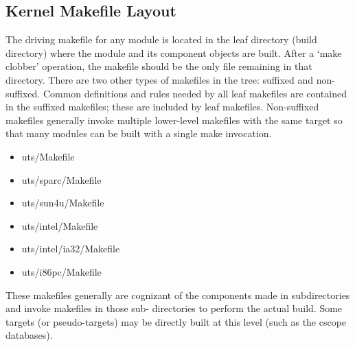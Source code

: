 \documentclass{article}
\begin{document}
\subsection*{Kernel Makefile Layout}

The driving makefile for any module is located in the leaf directory (build
directory) where the module and its component objects are built. After a `make
clobber' operation, the makefile should be the only file remaining in that
directory. There are two other types of makefiles in the tree: suffixed and
non-suffixed. Common definitions and rules needed by all leaf makefiles are
contained in the suffixed makefiles; these are included by leaf
makefiles. Non-suffixed makefiles generally invoke multiple lower-level
makefiles with the same target so that many modules can be built with a single
make invocation.

\begin{itemize}
  \setlength{\itemsep}{0.5pt}
  \setlength{\parskip}{0pt}
\item[] uts/Makefile
\item[] uts/sparc/Makefile
\item[] uts/sun4u/Makefile
\item[] uts/intel/Makefile
\item[] uts/intel/ia32/Makefile
\item[] uts/i86pc/Makefile
\end{itemize}

These makefiles generally are cognizant of the components made in
subdirectories and invoke makefiles in those sub- directories to perform the
actual build. Some targets (or pseudo-targets) may be directly built at this
level (such as the cscope databases).
\end{document}
